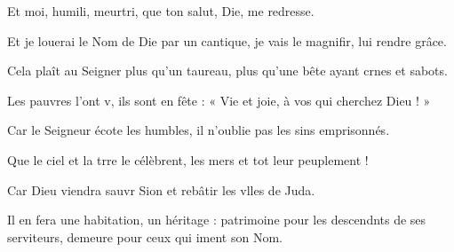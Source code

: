 \item Et moi, humili, meurtri,\psstar{} que ton salut, Die, me redresse.
\item Et je louerai le Nom de Die par un cantique,\psstar{} je vais le magnifir, lui rendre grâce.
\item Cela plaît au Seigner plus qu’un taureau,\psstar{} plus qu’une bête ayant crnes et sabots.
\item Les pauvres l’ont v, ils sont en fête :\psstar{} « Vie et joie, à vos qui cherchez Dieu ! »
\item Car le Seigneur écote les humbles,\psstar{} il n’oublie pas les sins emprisonnés.
\item Que le ciel et la trre le célèbrent,\psstar{} les mers et tot leur peuplement !
\item Car Dieu viendra sauvr Sion\psstar{} et rebâtir les vlles de Juda. 
\item Il en fera une habitation, un héritage :\pscross{} patrimoine pour les descendnts de ses serviteurs,\psstar{} demeure pour ceux qui iment son Nom.